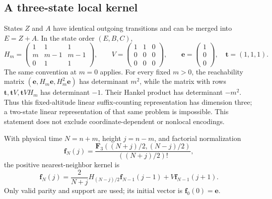 \documentclass[11pt,letterpaper]{article}
\numberwithin{equation}{section}
\theoremstyle{remark}
\begin{document}
\subsection{A three-state local kernel}
States $Z$ and $A$ have identical outgoing transitions and can be merged
into $E=Z+A$. In the state order $(E,B,C)$,
\begin{equation}\label{air:cb:eq:three-state}
H_m=\begin{pmatrix}1&1&1\\m&m-1&m-1\\0&1&1\end{pmatrix},\qquad
V=\begin{pmatrix}1&1&0\\0&0&0\\0&0&0\end{pmatrix},\qquad
\mathbf e=\begin{pmatrix}1\\0\\0\end{pmatrix},\quad
\mathbf t=(1,1,1).
\end{equation}
The same convention at $m=0$ applies. For every fixed $m>0$, the
reachability matrix $(\mathbf e,H_m\mathbf e,H_m^2\mathbf e)$ has determinant
$m^2$, while the matrix with rows $\mathbf t,\mathbf tV,\mathbf tVH_m$ has
determinant $-1$. Their Hankel product has determinant $-m^2$. Thus this
fixed-altitude linear suffix-counting representation has dimension three;
a two-state linear representation of that same problem is impossible.
This statement does not exclude coordinate-dependent or nonlocal encodings.

With physical time $N=n+m$, height $j=n-m$, and factorial normalization
\[
\mathbf f_N(j)=\frac{\mathbf F_3((N+j)/2,(N-j)/2)}{((N+j)/2)!},
\]
the positive nearest-neighbor kernel is
\begin{equation}\label{air:cb:eq:vector-kernel}
\mathbf f_N(j)=\frac{2}{N+j}H_{(N-j)/2}\mathbf f_{N-1}(j-1)
+V\mathbf f_{N-1}(j+1).
\end{equation}
Only valid parity and support are used; its initial vector is
$\mathbf f_0(0)=\mathbf e$.
\end{document}
